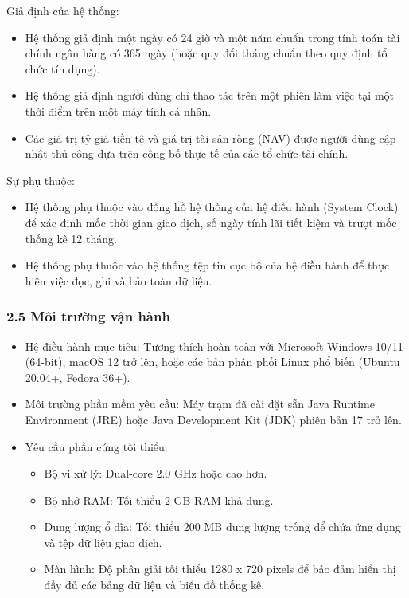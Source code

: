 \documentclass[11pt,a4paper]{article}
\providecommand{\tightlist}{
  \setlength{\itemsep}{0pt}\setlength{\parskip}{0pt}}
\begin{document}
Giả định của hệ thống:

\begin{itemize}
\tightlist
\item
  Hệ thống giả định một ngày có 24 giờ và một năm chuẩn trong tính toán
  tài chính ngân hàng có 365 ngày (hoặc quy đổi tháng chuẩn theo quy
  định tổ chức tín dụng).
\item
  Hệ thống giả định người dùng chỉ thao tác trên một phiên làm việc tại
  một thời điểm trên một máy tính cá nhân.
\item
  Các giá trị tỷ giá tiền tệ và giá trị tài sản ròng (NAV) được người
  dùng cập nhật thủ công dựa trên công bố thực tế của các tổ chức tài
  chính.
\end{itemize}

Sự phụ thuộc:

\begin{itemize}
\tightlist
\item
  Hệ thống phụ thuộc vào đồng hồ hệ thống của hệ điều hành (System
  Clock) để xác định mốc thời gian giao dịch, số ngày tính lãi tiết kiệm
  và trượt mốc thống kê 12 tháng.
\item
  Hệ thống phụ thuộc vào hệ thống tệp tin cục bộ của hệ điều hành để
  thực hiện việc đọc, ghi và bảo toàn dữ liệu.
\end{itemize}

\subsubsection{2.5 Môi trường vận
hành}\label{25-muxf4i-trux1b0ux1eddng-vux1eadn-huxe0nh}

\begin{itemize}
\tightlist
\item
  Hệ điều hành mục tiêu: Tương thích hoàn toàn với Microsoft Windows
  10/11 (64-bit), macOS 12 trở lên, hoặc các bản phân phối Linux phổ
  biến (Ubuntu 20.04+, Fedora 36+).
\item
  Môi trường phần mềm yêu cầu: Máy trạm đã cài đặt sẵn Java Runtime
  Environment (JRE) hoặc Java Development Kit (JDK) phiên bản 17 trở
  lên.
\item
  Yêu cầu phần cứng tối thiểu:

  \begin{itemize}
  \tightlist
  \item
    Bộ vi xử lý: Dual-core 2.0 GHz hoặc cao hơn.
  \item
    Bộ nhớ RAM: Tối thiểu 2 GB RAM khả dụng.
  \item
    Dung lượng ổ đĩa: Tối thiểu 200 MB dung lượng trống để chứa ứng dụng
    và tệp dữ liệu giao dịch.
  \item
    Màn hình: Độ phân giải tối thiểu 1280 x 720 pixels để bảo đảm hiển
    thị đầy đủ các bảng dữ liệu và biểu đồ thống kê.
  \end{itemize}
\end{itemize}
\end{document}
